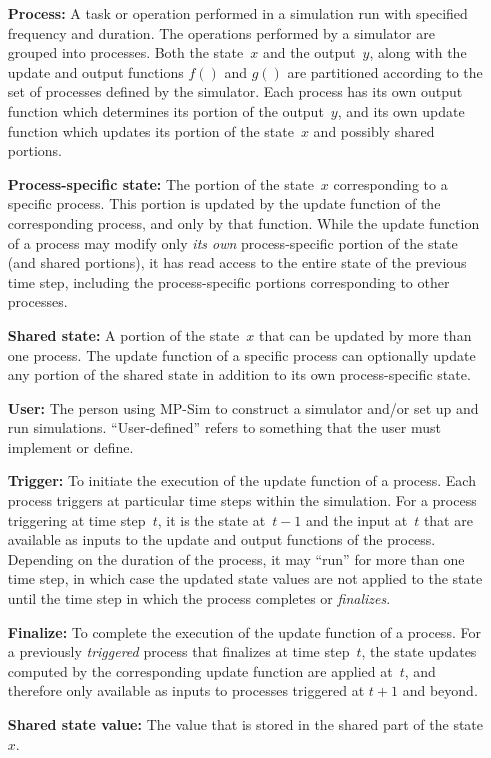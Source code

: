 \documentclass[12pt]{article}
\newcommand{\mpsim}[0]{{MP-Sim}}
\numberwithin{equation}{section}
\numberwithin{table}{section}
\numberwithin{figure}{section}
\begin{document}
\begin{itemize}
\item[\bf Process:] A task or operation performed in a simulation run with specified frequency and duration. The operations performed by a simulator are grouped into processes. Both the state~$x$ and the output~$y$, along with the update and output functions $f()$ and $g()$ are partitioned according to the set of processes defined by the simulator. Each process has its own output function which determines its portion of the output~$y$, and its own update function which updates its portion of the state~$x$ and possibly shared portions.
\item[\bf Process-specific state:] The portion of the state~$x$ corresponding to a specific process. This portion is updated by the update function of the corresponding process, and only by that function. While the update function of a process may modify only \emph{its own} process-specific portion of the state (and shared portions), it has read access to the entire state of the previous time step, including the process-specific portions corresponding to other processes.
\item[\bf Shared state:] A portion of the state~$x$ that can be updated by more than one process. The update function of a specific process can optionally update any portion of the shared state in addition to its own process-specific state.
\item[\bf User:] The person using \mpsim{} to construct a simulator and/or set up and run simulations. ``User-defined'' refers to something that the user must implement or define.
\item[\bf Trigger:] To initiate the execution of the update function of a process. Each process triggers at particular time steps within the simulation. For a process triggering at time step~$t$, it is the state at~$t-1$ and the input at~$t$ that are available as inputs to the update and output functions of the process. Depending on the duration of the process, it may ``run'' for more than one time step, in which case the updated state values are not applied to the state until the time step in which the process completes or \emph{finalizes}.
\item[\bf Finalize:] To complete the execution of the update function of a process. For a previously \emph{triggered} process that finalizes at time step~$t$, the state updates computed by the corresponding update function are applied at~$t$, and therefore only available as inputs to processes triggered at $t+1$ and beyond.
\item[\bf Shared state value:] The value that is stored in the shared part of the state $x$.

\end{itemize}
\end{document}
